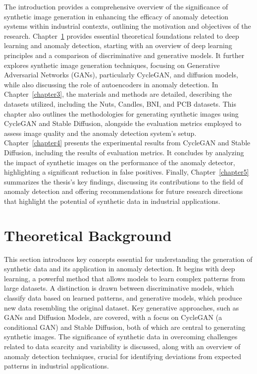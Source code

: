 \documentclass[12pt,DIV14,BCOR12mm,a4paper,footinclude=false,headinclude,parskip=half-,twoside,openright,cleardoublepage=empty,toc=index,bibliography=totoc,listof=totoc]{scrreprt}
\numberwithin{equation}{chapter}
\begin{document}
The introduction provides a comprehensive overview of the significance of synthetic image generation in enhancing the efficacy of anomaly detection systems within industrial contexts, outlining the motivation and objectives of the research. Chapter~\ref{chapter2} provides essential theoretical foundations related to deep learning and anomaly detection, starting with an overview of deep learning principles and a comparison of discriminative and generative models. It further explores synthetic image generation techniques, focusing on Generative Adversarial Networks (GANs), particularly CycleGAN, and diffusion models, while also discussing the role of autoencoders in anomaly detection. In Chapter~\ref{chapter3}, the materials and methods are detailed, describing the datasets utilized, including the Nuts, Candles, BNI, and PCB datasets. This chapter also outlines the methodologies for generating synthetic images using CycleGAN and Stable Diffusion, alongside the evaluation metrics employed to assess image quality and the anomaly detection system's setup. Chapter~\ref{chapter4} presents the experimental results from CycleGAN and Stable Diffusion, including the results of evaluation metrics. It concludes by analyzing the impact of synthetic images on the performance of the anomaly detector, highlighting a significant reduction in false positives. Finally, Chapter~\ref{chapter5} summarizes the thesis's key findings, discussing its contributions to the field of anomaly detection and offering recommendations for future research directions that highlight the potential of synthetic data in industrial applications.

\chapter{Theoretical Background}
\label{chapter2}
This section introduces key concepts essential for understanding the generation of synthetic data and its application in anomaly detection. It begins with deep learning, a powerful method that allows models to learn complex patterns from large datasets. A distinction is drawn between discriminative models, which classify data based on learned patterns, and generative models, which produce new data resembling the original dataset. Key generative approaches, such as GANs and Diffusion Models, are covered, with a focus on CycleGAN (a conditional GAN) and Stable Diffusion, both of which are central to generating synthetic images. The significance of synthetic data in overcoming challenges related to data scarcity and variability is discussed, along with an overview of anomaly detection techniques, crucial for identifying deviations from expected patterns in industrial applications.
\end{document}
